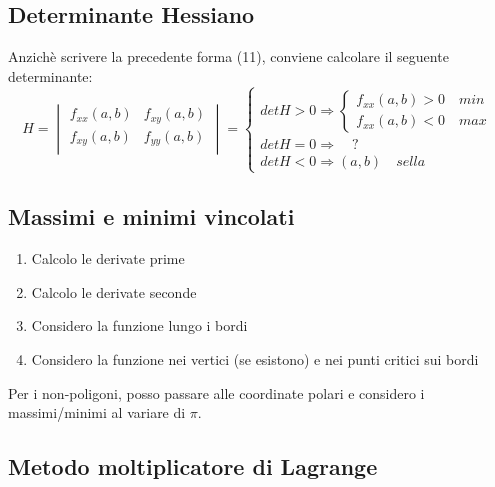 \documentclass[10pt,a4paper,fleqn]{article}
\begin{document}
	\subsection{Determinante Hessiano}

	Anzichè scrivere la precedente forma (11), conviene calcolare il seguente determinante:
	\begin{equation}
	H = \begin{vmatrix}
	f_{xx}(a,b) & f_{xy}(a,b) \\
	f_{xy}(a,b) & f_{yy}(a,b) \\
	\end{vmatrix}
	= \begin{cases}
	detH > 0 \Rightarrow \begin{cases}
	f_{xx}(a,b) > 0 \quad \textit{min}\\
	f_{xx}(a,b) < 0 \quad \textit{max}
	\end{cases}\\
	detH = 0 \Rightarrow \quad?\\
	detH < 0 \Rightarrow (a,b) \quad \textit{sella}
	
	\end{cases}
	\end{equation}

	\subsection{Massimi e minimi vincolati}

	\begin{enumerate}
	\item Calcolo le derivate prime
	\item Calcolo le derivate seconde
	\item Considero la funzione lungo i bordi
	\item Considero la funzione nei vertici (se esistono) e nei punti critici sui bordi
	\end{enumerate}
	Per i non-poligoni, posso passare alle coordinate polari e considero i massimi/minimi al variare di $\pi$.

	\subsection{Metodo moltiplicatore di Lagrange}
\end{document}
